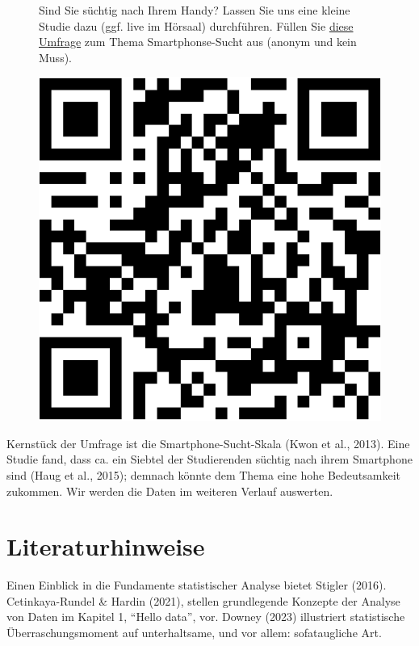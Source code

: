 \documentclass[
  letterpaper,
]{scrbook}
\theoremstyle{definition}
\theoremstyle{definition}
\theoremstyle{definition}
\theoremstyle{remark}
\begin{document}
\begin{figure}

\begin{minipage}{0.80\linewidth}
Sind Sie süchtig nach Ihrem Handy? Lassen Sie uns eine kleine Studie
dazu (ggf. live im Hörsaal) durchführen. Füllen Sie
\href{https://forms.gle/PP8yb6Ubqq3JU78F9}{diese Umfrage} zum Thema
Smartphonse-Sucht aus (anonym und kein Muss).\end{minipage}%
%
\begin{minipage}{0.20\linewidth}

\begin{center}
\includegraphics[width=0.75\linewidth,height=\textheight,keepaspectratio]{010-rahmen_files/figure-pdf/qr-google-forms-handysucht-1.pdf}
\end{center}

\end{minipage}%

\end{figure}%

Kernstück der Umfrage ist die Smartphone-Sucht-Skala (Kwon et al.,
2013). Eine Studie fand, dass ca. ein Siebtel der Studierenden süchtig
nach ihrem Smartphone sind (Haug et al., 2015); demnach könnte dem Thema
eine hohe Bedeutsamkeit zukommen. Wir werden die Daten im weiteren
Verlauf auswerten.

\section{Literaturhinweise}\label{literaturhinweise}

Einen Einblick in die Fundamente statistischer Analyse bietet Stigler
(2016). Cetinkaya-Rundel \& Hardin (2021), stellen grundlegende Konzepte
der Analyse von Daten im Kapitel 1, \enquote{Hello data}, vor. Downey
(2023) illustriert statistische Überraschungsmoment auf unterhaltsame,
und vor allem: sofataugliche Art.
\end{document}
